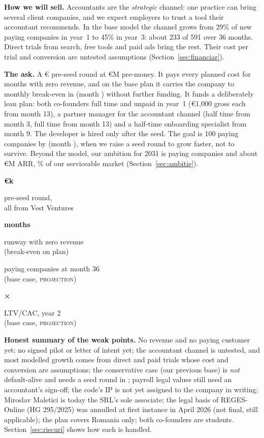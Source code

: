 \documentclass[10pt,a4paper]{article}
\newcommand{\proj}{\textcolor{brandTeal}{\textsc{projection}}}
\newcommand{\cifra}[2]{%
  \begin{minipage}[t]{0.235\linewidth}\vspace{0pt}\centering
    {\titlufont\bfseries\Large\color{brandBlue}#1}\par\vspace{1pt}
    {\footnotesize\color{brandSlate}\RaggedRight\centering #2\par}
  \end{minipage}}
\begin{document}
\textbf{How we will sell.} Accountants are the \emph{strategic} channel: one practice can bring
several client companies, and we expect employers to trust a tool their accountant recommends.
In the base model the channel grows from 29\% of new paying companies in year~1 to 45\% in
year~3: about 233 of 591 over 36 months. Direct trials from search, free tools and paid ads bring
the rest. Their cost per trial and conversion are untested assumptions (Section~\ref{sec:financiar}).

\textbf{The ask.} A € pre-seed round at €M pre-money. It pays
every planned cost for  months with zero revenue, and on the base plan it carries
the company to monthly break-even in  (month ) without
further funding. It funds a deliberately lean plan: both co-founders full time and unpaid in
year~1 (€1,000 gross each from month 13), a partner
manager for the accountant channel (half time from month 3, full time from month 13) and a
half-time onboarding specialist from month 9. The developer is hired only after the seed. The
goal is 100 paying companies by  (month ), when we
raise a seed round to grow faster, not to survive. Beyond the model, our ambition for 2031 is
 paying companies and about €M ARR,
\% of our serviceable market (Section~\ref{sec:ambitie}).

\vspace{4pt}
\noindent
\cifra{€k}{pre-seed round,\\all from Vest Ventures}\hfill
\cifra{ months}{runway with zero revenue\\(break-even \cf{base.breakeven_date} on plan)}\hfill
\cifra{}{paying companies at month 36\\(base case, \proj)}\hfill
\cifra{×}{LTV/CAC, year 2\\(base case, \proj)}

\begin{alertbox}
\small\textbf{Honest summary of the weak points.} No revenue and no paying customer yet; no
signed pilot or letter of intent yet; the accountant channel is untested, and most modelled
growth comes from direct and paid trials whose cost and conversion are assumptions; the
conservative case (our previous base) is \emph{not} default-alive and needs a seed round in
; payroll legal values still need an accountant's
sign-off; the code's IP is not yet assigned to the company in writing; Miroslav Maletici is
today the SRL's sole associate; the legal basis of
REGES-Online (HG 295/2025) was annulled at first instance in April 2026 (not final, still
applicable); the plan covers Romania only; both co-founders are students.
Section~\ref{sec:riscuri} shows how each is handled.
\end{alertbox}
\end{document}
